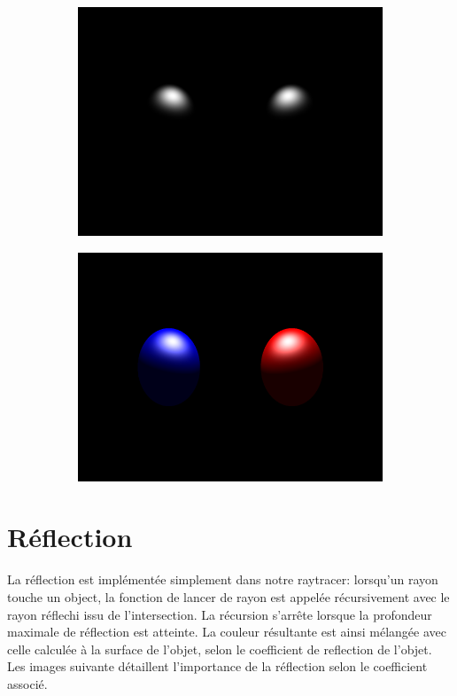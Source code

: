 \documentclass{article}
\begin{document}
\begin{figure}[hb]
  \begin{subfigure}{0.45\textwidth}
    \includegraphics[width=1\textwidth]{images/phong3.png}
  \end{subfigure}
  \begin{subfigure}{0.45\textwidth}
    \includegraphics[width=1\textwidth]{images/phong4.png}
  \end{subfigure}
\end{figure}

\clearpage

\section{Réflection}
La réflection est implémentée simplement dans notre raytracer: lorsqu'un rayon
touche un object, la fonction de lancer de rayon est appelée récursivement avec
le rayon réflechi issu de l'intersection. La récursion s'arrête lorsque la
profondeur maximale de réflection est atteinte. La couleur résultante est ainsi
mélangée avec celle calculée à la surface de l'objet, selon le coefficient de
reflection de l'objet. Les images suivante détaillent l'importance de la
réflection selon le coefficient associé.
\end{document}
